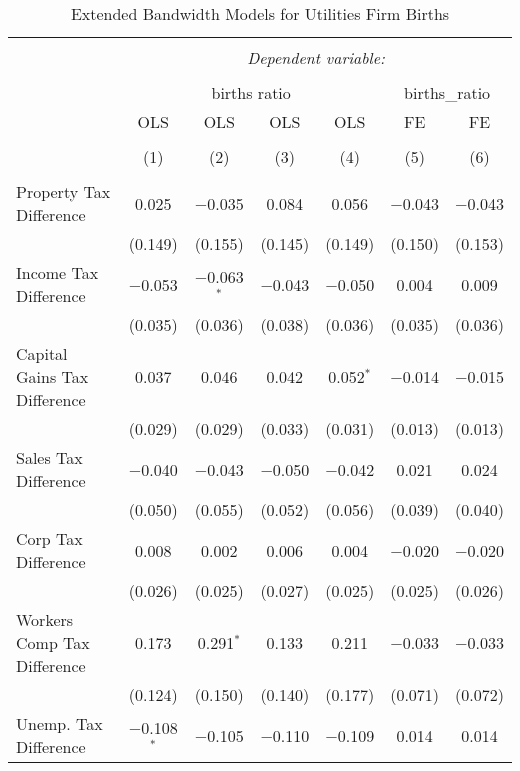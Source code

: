 
\begin{table}[!htbp] \centering 
  \caption{Extended Bandwidth Models for  Utilities Firm Births} 
  \label{22eb} 
\begin{tabular}{@{\extracolsep{5pt}}lcccccc} 
\\[-1.8ex]\hline 
\hline \\[-1.8ex] 
 & \multicolumn{6}{c}{\textit{Dependent variable:}} \\ 
\cline{2-7} 
\\[-1.8ex] & \multicolumn{4}{c}{births ratio} & \multicolumn{2}{c}{births\_ratio} \\ 
 & OLS & OLS & OLS & OLS & FE & FE \\ 
\\[-1.8ex] & (1) & (2) & (3) & (4) & (5) & (6)\\ 
\hline \\[-1.8ex] 
 Property Tax Difference & 0.025 & $-$0.035 & 0.084 & 0.056 & $-$0.043 & $-$0.043 \\ 
  & (0.149) & (0.155) & (0.145) & (0.149) & (0.150) & (0.153) \\ 
  Income Tax Difference & $-$0.053 & $-$0.063$^{*}$ & $-$0.043 & $-$0.050 & 0.004 & 0.009 \\ 
  & (0.035) & (0.036) & (0.038) & (0.036) & (0.035) & (0.036) \\ 
  Capital Gains Tax Difference & 0.037 & 0.046 & 0.042 & 0.052$^{*}$ & $-$0.014 & $-$0.015 \\ 
  & (0.029) & (0.029) & (0.033) & (0.031) & (0.013) & (0.013) \\ 
  Sales Tax Difference & $-$0.040 & $-$0.043 & $-$0.050 & $-$0.042 & 0.021 & 0.024 \\ 
  & (0.050) & (0.055) & (0.052) & (0.056) & (0.039) & (0.040) \\ 
  Corp Tax Difference & 0.008 & 0.002 & 0.006 & 0.004 & $-$0.020 & $-$0.020 \\ 
  & (0.026) & (0.025) & (0.027) & (0.025) & (0.025) & (0.026) \\ 
  Workers Comp Tax Difference & 0.173 & 0.291$^{*}$ & 0.133 & 0.211 & $-$0.033 & $-$0.033 \\ 
  & (0.124) & (0.150) & (0.140) & (0.177) & (0.071) & (0.072) \\ 
  Unemp. Tax Difference & $-$0.108$^{*}$ & $-$0.105 & $-$0.110 & $-$0.109 & 0.014 & 0.014 \\ 

\end{tabular}
\end{table}
